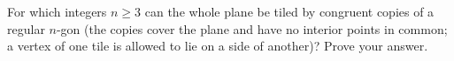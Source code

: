 For which integers $n\ge3$ can the whole plane be tiled by congruent copies of a regular $n$-gon (the copies cover the plane and have no interior points in common; a vertex of one tile is allowed to lie on a side of another)? Prove your answer.
